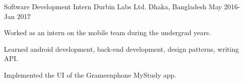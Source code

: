 \begin{cventries}
  \cventry
    {Software Development Intern} %
    {Durbin Labs Ltd.} %
    {Dhaka, Bangladesh} %
    {May 2016-Jan 2017} %
    {
      \begin{cvitems} %
        \item {Worked as an intern on the mobile team during the undergrad years.}
        \item {Learned android development, back-end development, design patterns, writing API.}
        \item {Implemented the UI of the Grameenphone MyStudy app.}
      \end{cvitems}
    }

\end{cventries}
